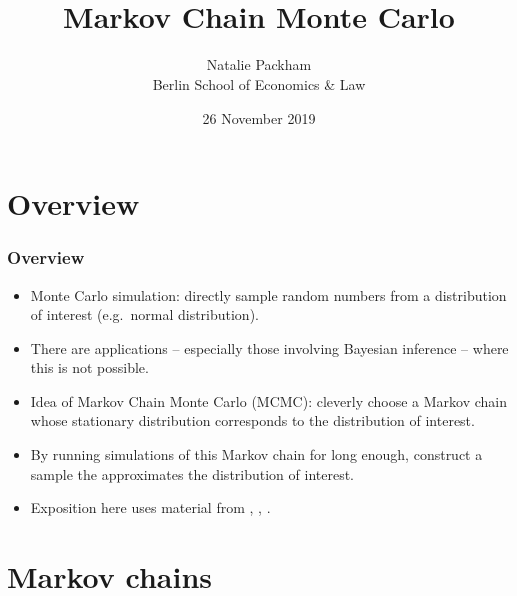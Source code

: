 \documentclass[xcolor=table,10pt]{beamer}
\title[MCMC, 26 Nov 2019]{\bigskip\\
Markov Chain Monte Carlo\\[3pt] 
}
\author[{\textcopyright} N.\ Packham]{
      Natalie Packham\\
      Berlin  School of Economics \& Law
  }
\institute{\normalsize
 Bayesian Statistics Explorations
}
\date{
26 November 2019
}
\begin{document}
\setcounter{tocdepth}{2}%

\frame{\thispagestyle{empty}\titlepage}

  \logo{}



  
\section{Overview}

\begin{frame}
  \frametitle{Overview}
  \begin{itemize}
  \item \alert{Monte Carlo simulation}: directly sample random numbers
    from a distribution of interest (e.g.\ normal distribution).
  \item There are applications -- especially those involving
    \alert{Bayesian inference} -- where this is not possible.
  \item Idea of \alert{Markov Chain Monte Carlo (MCMC)}: cleverly
    choose a Markov chain whose stationary distribution corresponds to
    the distribution of interest.
  \item By running simulations of this Markov chain for long enough,
    construct a sample the approximates the distribution of interest. 
  \item Exposition here uses material from \citep{Lemieux2009},
    \citep{Stachurski2016}, \citep{Fahrmeir2009}. 
  \end{itemize}
\end{frame}


\section{Markov chains}
\end{document}

